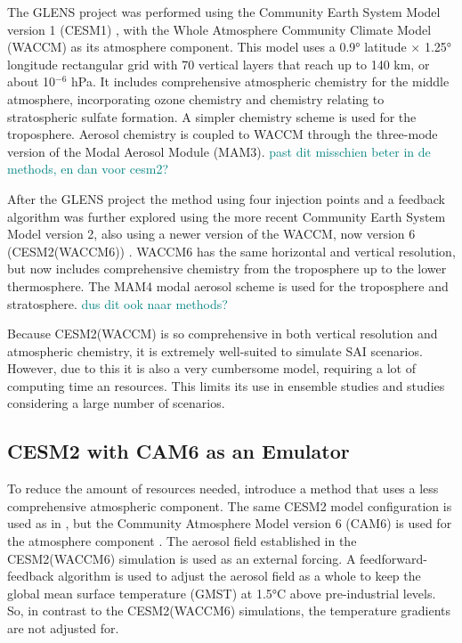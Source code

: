 The GLENS project was performed using the Community Earth System Model version 1 (CESM1) \parencite{hurrell2013}, with the Whole Atmosphere Community Climate Model (WACCM) as its atmosphere component. This model uses a 0.9° latitude $\times$ 1.25° longitude rectangular grid with 70 vertical layers that reach up to 140 km, or about 10$^{-6}$ hPa. It includes comprehensive atmospheric chemistry for the middle atmosphere, incorporating ozone chemistry and chemistry relating to stratospheric sulfate formation. A simpler chemistry scheme is used for the troposphere. Aerosol chemistry is coupled to WACCM through the three-mode version of the Modal Aerosol Module (MAM3). \textcolor{teal}{past dit misschien beter in de methods, en dan voor cesm2?}

After the GLENS project the method using four injection points and a feedback algorithm was further explored using the more recent Community Earth System Model version 2, also using a newer version of the WACCM, now version 6 (CESM2(WACCM6)) \parencite{tilmes2020}. WACCM6 has the same horizontal and vertical resolution, but now includes comprehensive chemistry from the troposphere up to the lower thermosphere. The MAM4 modal aerosol scheme is used for the troposphere and stratosphere. \textcolor{teal}{dus dit ook naar methods? }

Because CESM2(WACCM) is so comprehensive in both vertical resolution and atmospheric chemistry, it is extremely well-suited to simulate SAI scenarios. However, due to this it is also a very cumbersome model, requiring a lot of computing time an resources. This limits its use in ensemble studies and studies considering a large number of scenarios. 

\subsection{CESM2 with CAM6 as an Emulator}
To reduce the amount of resources needed, \textcite{pfluger2024} introduce a method that uses a less comprehensive atmospheric component. The same CESM2 model configuration is used as in \textcite{tilmes2020}, but the Community Atmosphere Model version 6 (CAM6) is used for the atmosphere component \parencite{danabasoglu2020}. The aerosol field established in the CESM2(WACCM6) simulation is used as an external forcing. A feedforward-feedback algorithm is used to adjust the aerosol field as a whole to keep the global mean surface temperature (GMST) at 1.5°C above pre-industrial levels. So, in contrast to the CESM2(WACCM6) simulations, the temperature gradients are not adjusted for. 

